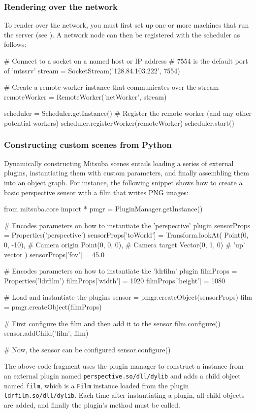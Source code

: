 \subsubsection{Rendering over the network}
To render over the network, you must first set up one or
more machines that run the  server (see ).
A network node can then be registered with the scheduler as follows:
\begin{python}
# Connect to a socket on a named host or IP address
# 7554 is the default port of 'mtssrv'
stream = SocketStream('128.84.103.222', 7554)

# Create a remote worker instance that communicates over the stream
remoteWorker = RemoteWorker('netWorker', stream)

scheduler = Scheduler.getInstance()
# Register the remote worker (and any other potential workers)
scheduler.registerWorker(remoteWorker)
scheduler.start()
\end{python}

\subsubsection{Constructing custom scenes from Python}
Dynamically constructing Mitsuba scenes entails loading a series of external
plugins, instantiating them with custom parameters, and finally assembling
them into an object graph.
For instance, the following snippet shows how to create a basic
perspective sensor with a film that writes PNG images:
\begin{python}
from mitsuba.core import *
pmgr = PluginManager.getInstance()

# Encodes parameters on how to instantiate the 'perspective' plugin
sensorProps = Properties('perspective')
sensorProps['toWorld'] = Transform.lookAt(
    Point(0, 0, -10),  # Camera origin
    Point(0, 0, 0),    # Camera target
    Vector(0, 1, 0)    # 'up' vector
)
sensorProps['fov'] = 45.0

# Encodes parameters on how to instantiate the 'ldrfilm' plugin
filmProps = Properties('ldrfilm')
filmProps['width'] = 1920
filmProps['height'] = 1080

# Load and instantiate the plugins
sensor = pmgr.createObject(sensorProps)
film = pmgr.createObject(filmProps)

# First configure the film and then add it to the sensor
film.configure()
sensor.addChild('film', film)

# Now, the sensor can be configured
sensor.configure()
\end{python}
The above code fragment uses the plugin manager to construct a
 instance from an external plugin named
\texttt{perspective.so/dll/dylib} and adds a child object
named \texttt{film}, which is a \texttt{Film} instance loaded from the
plugin \texttt{ldrfilm.so/dll/dylib}.
Each time after instantiating a plugin, all child objects are added, and
finally the  plugin's  method must be called.

